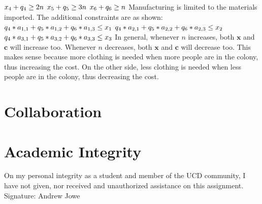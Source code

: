 \documentclass{article}
\begin{document}
\begin{enumerate}
        $\\x_4 + q_4 \geq 2n$
        $\\x_5 + q_5 \geq 3n$
        $\\x_6 + q_6 \geq n$
        \newline Manufacturing is limited to the materials imported. The additional constraints are as shown:
        $\\q_4*a_{1,1} + q_5*a_{1,2} + q_6*a_{1,3} \leq x_1$
        $\\q_4*a_{2,1} + q_5*a_{2,2} + q_6*a_{2,3} \leq x_2$
        $\\q_4*a_{3,1} + q_5*a_{3,2} + q_6*a_{3,3} \leq x_3$
        \newline In general, whenever $n$ increases, both $\textbf{x}$ and $\textbf{c}$ will increase too. Whenever $n$ decreases, both $\textbf{x}$ and $\textbf{c}$ will decrease too. This makes sense because more clothing is needed when more people are in the colony, thus increasing the cost. On the other side, less clothing is needed when less people are in the colony, thus decreasing the cost.
\end{enumerate}

\newpage
\section{Collaboration}

\newpage
\section{Academic Integrity}
On my personal integrity as a student and member of the UCD community, I have not given, nor received and unauthorized assistance on this assignment.
\newline Signature: Andrew Jowe
\end{document}
